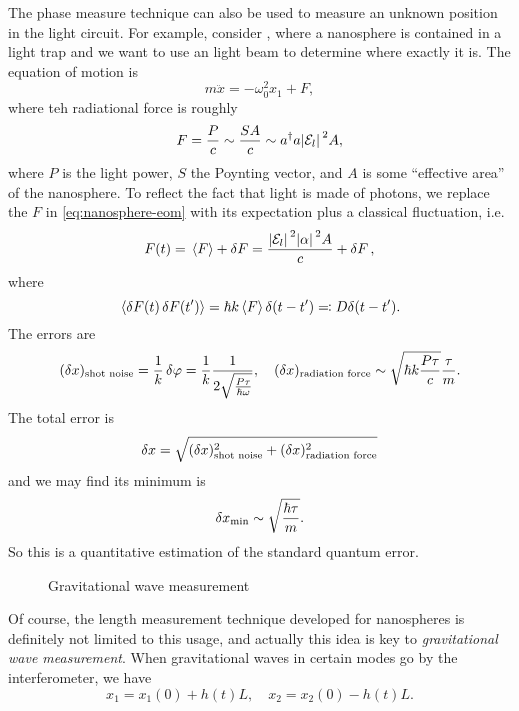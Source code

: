 \documentclass[hyperref, a4paper]{article}
\begin{document}
The phase measure technique can also be used to measure an unknown position in the light circuit.
For example, consider , where a nanosphere is contained in a light trap and we want to use an light beam to determine where exactly it is.
The equation of motion is 
\begin{equation}
    m \ddot{x} = - \omega_0^2 x_1 + F,
    \label{eq:nanosphere-eom}
\end{equation}
where teh radiational force is roughly
\begin{equation}
    F = \frac{P}{c} \sim \frac{SA}{c} \sim a^\dagger a \abs*{\mathcal{E}_l}^2 A,
\end{equation}
where $P$ is the light power, $S$ the Poynting vector, and $A$ is some ``effective area'' of the nanosphere.
To reflect the fact that light is made of photons, we replace the $F$ in \eqref{eq:nanosphere-eom} with its expectation plus a classical fluctuation, i.e.
\begin{equation}
    F(t) = \expval*{F} + \var{F} = \frac{\abs*{\mathcal{E}_l}^2 \abs*{\alpha}^2 A}{c} + \var{F},
\end{equation}
where 
\begin{equation}
    \expval*{\var{F(t)} \var{F(t')}} = \hbar k \expval*{F} \delta(t - t') \eqqcolon D \delta(t - t').
\end{equation}
The errors are
\begin{equation}
    (\var{x})_\text{shot noise} = \frac{1}{k} \var{\varphi} = \frac{1}{k} \frac{1}{2 \sqrt{\frac{P \tau}{\hbar \omega}}} , \quad (\var{x})_\text{radiation force} \sim \sqrt{\hbar k \frac{P \tau}{c}} \frac{\tau}{m}.
\end{equation}
The total error is 
\begin{equation}
    \var{x} = \sqrt{ (\var{x})_\text{shot noise}^2 + (\var{x})_\text{radiation force}^2 }
\end{equation}
and we may find its minimum is 
\begin{equation}
    \var{x}_\text{min} \sim \sqrt{\frac{\hbar \tau}{m}}.
\end{equation}
So this is a quantitative estimation of the standard quantum error.

\begin{figure}
    \centering
    
    \caption{Gravitational wave measurement}
\end{figure}

Of course, the length measurement technique developed for nanospheres is definitely not limited to this usage, and actually this idea is key to \emph{gravitational wave measurement}.
When gravitational waves in certain modes go by the interferometer, we have 
\begin{equation}
    x_1 = x_1(0) + h(t) L, \quad x_2 = x_2(0) - h(t) L.
\end{equation}
\end{document}

